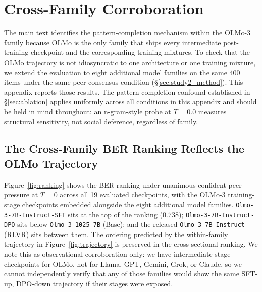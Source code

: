 \documentclass[11pt]{article}
\begin{document}
\section{Cross-Family Corroboration}
\label{app:cross_family}

\noindent The main text identifies the pattern-completion mechanism within the OLMo-3 family because OLMo is the only family that ships every intermediate post-training checkpoint and the corresponding training mixtures. To check that the OLMo trajectory is not idiosyncratic to one architecture or one training mixture, we extend the evaluation to eight additional model families on the same 400 items under the same peer-consensus condition (\S\ref{sec:study2_method}). This appendix reports those results. The pattern-completion confound established in \S\ref{sec:ablation} applies uniformly across all conditions in this appendix and should be held in mind throughout: an n-gram-style probe at $T{=}0.0$ measures structural sensitivity, not social deference, regardless of family.

\subsection{The Cross-Family BER Ranking Reflects the OLMo Trajectory}
\label{app:cross_family_ranking}

\noindent Figure~\ref{fig:ranking} shows the BER ranking under unanimous-confident peer pressure at $T{=}0$ across all 19 evaluated checkpoints, with the OLMo-3 training-stage checkpoints embedded alongside the eight additional model families. \texttt{Olmo-3-7B-Instruct-SFT} sits at the top of the ranking ($0.738$); \texttt{Olmo-3-7B-Instruct-DPO} sits below \texttt{Olmo-3-1025-7B} (Base); and the released \texttt{Olmo-3-7B-Instruct} (RLVR) sits between them. The ordering predicted by the within-family trajectory in Figure~\ref{fig:trajectory} is preserved in the cross-sectional ranking. We note this as observational corroboration only: we have intermediate stage checkpoints for OLMo, not for Llama, GPT, Gemini, Grok, or Claude, so we cannot independently verify that any of those families would show the same SFT-up, DPO-down trajectory if their stages were exposed.
\end{document}
